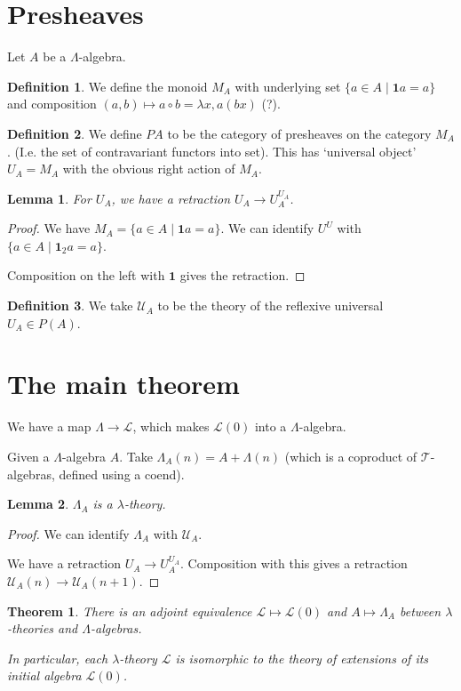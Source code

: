 \documentclass{amsart}
\newtheorem{theorem}{Theorem}
\newtheorem{lemma}{Lemma}
\theoremstyle{definition}
\newtheorem{definition}{Definition}
\begin{document}
  \section{Presheaves}
  Let $ A $ be a $ \Lambda $-algebra.

  \begin{definition}
    We define the monoid $ M_A $ with underlying set $ \{ a \in A \mid \mathbf 1 a = a \} $ and composition $ (a, b) \mapsto a \circ b = \lambda x, a(b x) $ (?).
  \end{definition}

  \begin{definition}
    We define $ PA $ to be the category of presheaves on the category $ M_A $. (I.e. the set of contravariant functors into set). This has `universal object' $ U_A = M_A $ with the obvious right action of $ M_A $.
  \end{definition}

  \begin{lemma}
    For $ U_A $, we have a retraction $ U_A \to U_A^{U_A} $.
  \end{lemma}
  \begin{proof}
    We have $ M_A = \{ a \in A \mid \mathbf 1 a = a \} $. We can identify $ U^U $ with $ \{ a \in A \mid \mathbf 1_2 a = a \} $.

    Composition on the left with $ \mathbf 1 $ gives the retraction.
  \end{proof}

  \begin{definition}
    We take $ \mathcal U_A $ to be the theory of the reflexive universal $ U_A \in P(A) $.
  \end{definition}

  \section{The main theorem}

  We have a map $ \Lambda \to \mathcal L $, which makes $ \mathcal L(0) $ into a $ \Lambda $-algebra.

  Given a $ \Lambda $-algebra $ A $. Take $ \Lambda_A(n) = A + \Lambda(n) $ (which is a coproduct of $ \mathcal T $-algebras, defined using a coend).
  
  \begin{lemma}
    $ \Lambda_A $ is a $ \lambda $-theory.
  \end{lemma}
  \begin{proof}
    We can identify $ \Lambda_A $ with $ \mathcal U_A $.

    We have a retraction $ U_A \to U_A^{U_A} $. Composition with this gives a retraction $ \mathcal U_A(n) \to \mathcal U_A(n + 1) $. 
  \end{proof}

  \begin{theorem}
    There is an adjoint equivalence $ \mathcal L \mapsto \mathcal L(0) $ and $ A \mapsto \Lambda_A $ between $ \lambda $-theories and  $ \Lambda $-algebras.

    In particular, each $ \lambda $-theory $ \mathcal L $ is isomorphic to the theory of extensions of its initial algebra $ \mathcal L(0) $.
  \end{theorem}
\end{document}

